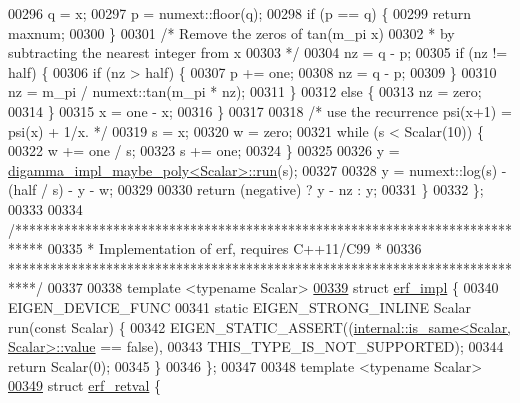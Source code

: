 \begin{DoxyCode}
00296       q = x;
00297       p = numext::floor(q);
00298       \textcolor{keywordflow}{if} (p == q) \{
00299         \textcolor{keywordflow}{return} maxnum;
00300       \}
00301       \textcolor{comment}{/* Remove the zeros of tan(m\_pi x)}
00302 \textcolor{comment}{       * by subtracting the nearest integer from x}
00303 \textcolor{comment}{       */}
00304       nz = q - p;
00305       \textcolor{keywordflow}{if} (nz != half) \{
00306         \textcolor{keywordflow}{if} (nz > half) \{
00307           p += one;
00308           nz = q - p;
00309         \}
00310         nz = m\_pi / numext::tan(m\_pi * nz);
00311       \}
00312       \textcolor{keywordflow}{else} \{
00313         nz = zero;
00314       \}
00315       x = one - x;
00316     \}
00317 
00318     \textcolor{comment}{/* use the recurrence psi(x+1) = psi(x) + 1/x. */}
00319     s = x;
00320     w = zero;
00321     \textcolor{keywordflow}{while} (s < Scalar(10)) \{
00322       w += one / s;
00323       s += one;
00324     \}
00325 
00326     y = \hyperlink{struct_eigen_1_1internal_1_1digamma__impl__maybe__poly}{digamma\_impl\_maybe\_poly<Scalar>::run}(s);
00327 
00328     y = numext::log(s) - (half / s) - y - w;
00329 
00330     \textcolor{keywordflow}{return} (negative) ? y - nz : y;
00331   \}
00332 \};
00333 
00334 \textcolor{comment}{/****************************************************************************}
00335 \textcolor{comment}{ * Implementation of erf, requires C++11/C99                                *}
00336 \textcolor{comment}{ ****************************************************************************/}
00337 
00338 \textcolor{keyword}{template} <\textcolor{keyword}{typename} Scalar>
\hyperlink{struct_eigen_1_1internal_1_1erf__impl}{00339} \textcolor{keyword}{struct }\hyperlink{struct_eigen_1_1internal_1_1erf__impl}{erf\_impl} \{
00340   EIGEN\_DEVICE\_FUNC
00341   \textcolor{keyword}{static} EIGEN\_STRONG\_INLINE Scalar run(\textcolor{keyword}{const} Scalar) \{
00342     EIGEN\_STATIC\_ASSERT((\hyperlink{struct_eigen_1_1internal_1_1is__same}{internal::is\_same<Scalar, Scalar>::value} 
      == \textcolor{keyword}{false}),
00343                         THIS\_TYPE\_IS\_NOT\_SUPPORTED);
00344     \textcolor{keywordflow}{return} Scalar(0);
00345   \}
00346 \};
00347 
00348 \textcolor{keyword}{template} <\textcolor{keyword}{typename} Scalar>
\hyperlink{struct_eigen_1_1internal_1_1erf__retval}{00349} \textcolor{keyword}{struct }\hyperlink{struct_eigen_1_1internal_1_1erf__retval}{erf\_retval} \{

\end{DoxyCode}
